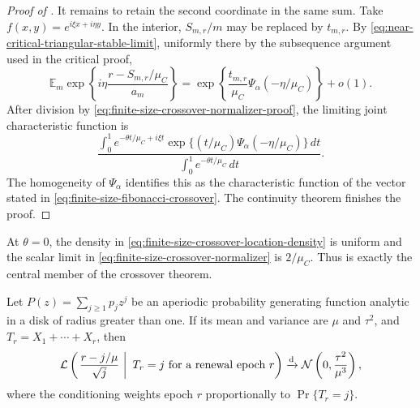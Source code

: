 \begin{proof}[Proof of ]
It remains to retain the second coordinate in the same sum.  Take
\(f(x,y)=e^{i\xi x+i\eta y}\).  In the interior,
\(S_{m,r}/m\) may be replaced by \(t_{m,r}\).  By
\eqref{eq:near-critical-triangular-stable-limit}, uniformly there by the
subsequence argument used in the critical proof,
\[
 \mathbb E_m\exp\left\{
 i\eta\frac{r-S_{m,r}/\mu_C}{a_m}\right\}
 =\exp\left\{\frac{t_{m,r}}{\mu_C}
 \Psi_\alpha(-\eta/\mu_C)\right\}+o(1).
\]
After division by \eqref{eq:finite-size-crossover-normalizer-proof}, the
limiting joint characteristic function is
\begin{equation}
 \frac{\displaystyle
 \int_0^1e^{-\theta t/\mu_C+i\xi t}
 \exp\{(t/\mu_C)\Psi_\alpha(-\eta/\mu_C)\}\,dt}
 {\displaystyle\int_0^1e^{-\theta t/\mu_C}\,dt}.
 \label{eq:finite-size-crossover-characteristic-function}
\end{equation}
The homogeneity of \(\Psi_\alpha\) identifies this as the characteristic
function of the vector stated in
\eqref{eq:finite-size-fibonacci-crossover}.  The continuity theorem finishes
the proof.
\end{proof}

At \(\theta=0\), the density in
\eqref{eq:finite-size-crossover-location-density} is uniform and the scalar
limit in \eqref{eq:finite-size-crossover-normalizer} is \(2/\mu_C\).
Thus  is exactly the central
member of the crossover theorem.

\begin{lemma}
\label{lem:gaussian-renewal-inversion}
Let \(P(z)=\sum_{j\ge1}p_jz^j\) be an aperiodic probability generating
function analytic in a disk of radius greater than one.  If its mean and
variance are \(\mu\) and \(\tau^2\), and
\(T_r=X_1+\cdots+X_r\), then
\begin{equation}
 \mathcal L\left(
 \left.\frac{r-j/\mu}{\sqrt j}\ \right|\ T_r=j
 \text{ for a renewal epoch }r\right)
 \xrightarrow{\rm d}\mathcal N\left(0,\frac{\tau^2}{\mu^3}\right),
 \label{eq:gaussian-renewal-inversion}
\end{equation}
where the conditioning weights epoch \(r\) proportionally to
\(\Pr\{T_r=j\}\).
\end{lemma}

